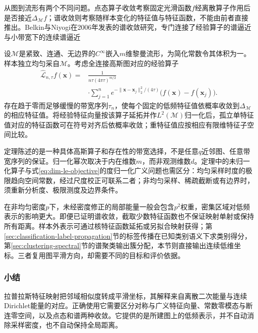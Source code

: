 从图到流形有两个不同问题。点态算子收敛考察固定光滑函数$f$经离散算子作用后是否接近$\Delta_{\mathcal{M}}f$；谱收敛则考察随样本变化的特征值与特征函数，不能由前者直接推出。Belkin与Niyogi在2006年发表的谱收敛研究，专门连接了经验算子的谱逼近与小带宽下的连续谱逼近

\begin{theorem}[一种定性的谱一致性结论]
  \label{thm:dim-le-spectral}
  设$\mathcal{M}$是紧致、连通、无边界的$C^\infty$嵌入$m$维黎曼流形，为简化常数令其体积为一。样本独立均匀采自$\mathcal{M}$。考虑全连接高斯图对应的经验算子
  \[
    \begin{aligned}
      \widehat{\mathcal{L}}_{n,\tau}f(\bm{x})
      ={}&\frac{1}{n\tau(4\pi\tau)^{m/2}}\\
      &\cdot\sum_{j=1}^n
        e^{-\lVert\bm{x}-\bm{x}_j\rVert_2^2/(4\tau)}
        \bigl(f(\bm{x})-f(\bm{x}_j)\bigr).
    \end{aligned}
  \]
  存在趋于零而足够缓慢的带宽序列$\tau_n$，使每个固定的低频特征值依概率收敛到$\Delta_{\mathcal{M}}$的相应特征值。将经验特征向量按该算子延拓并作$L^2(\mathcal{M})$归一化后，孤立单特征值对应的特征函数可在符号对齐后依概率收敛；重特征值应按相应有限维特征子空间比较。
\end{theorem}

定理陈述的是一种具体高斯算子和存在性的带宽选择，不是任意$q$近邻图、任意带宽序列的保证。归一化幂次取决于内在维数$m$，而非观测维数$d$。定理中的未归一化算子与式\eqref{eq:dim-le-objective}的度归一化广义问题也需区分：均匀采样时度的极限趋向空间常数，经过尺度校正可联系二者；非均匀采样、稀疏截断或有边界时，须重新分析度、极限测度及边界条件。

在非均匀密度$p$下，未经密度修正的局部能量一般会包含$p^2$权重，密集区域对低频表示的影响更大。即便已证明谱收敛，截取少数特征函数也不保证映射单射或保持所有距离。样本外表示可通过核特征函数延拓或另拟合映射获得；第\ref{sec:classification-label-propagation}节的标签传播在已知类别语义下求类别得分，第\ref{sec:clustering-spectral}节的谱聚类输出簇分配，本节则直接输出连续低维坐标。三者复用图平滑方向，却需要不同的目标和评价依据。

\subsubsection{小结}

拉普拉斯特征映射把邻域相似度转成平滑坐标，其解释来自离散二次能量与连续Dirichlet能量的对应。正确使用它需要区分对称与广义特征向量、常数零模态与断连零空间，以及点态和谱两种收敛。它提供的是所建图上的低频表示，并不自动消除采样密度，也不自动保持全局距离。

